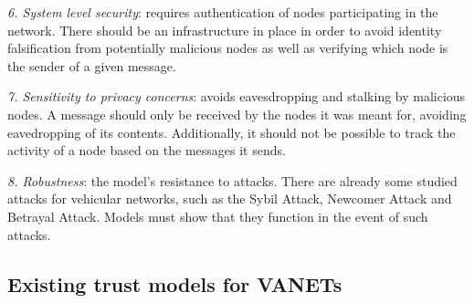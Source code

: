 \textit{6. System level security}: requires authentication of nodes participating in the network.
There should be an infrastructure in place in order to avoid identity falsification from potentially malicious nodes as well as verifying which node is the sender of a given message.


\textit{7. Sensitivity to privacy concerns}: avoids eavesdropping and stalking by malicious nodes.
A message should only be received by the nodes it was meant for, avoiding eavedropping of its contents.
Additionally, it should not be possible to track the activity of a node based on the messages it sends.


\textit{8. Robustness}: the model's resistance to attacks.
There are already some studied attacks for vehicular networks, such as the Sybil Attack, Newcomer Attack and Betrayal Attack.
Models must show that they function in the event of such attacks.


\subsection{Existing trust models for VANETs}
 
